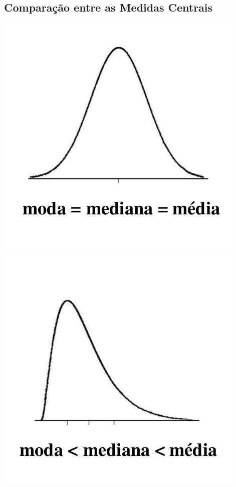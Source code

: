 \documentclass{beamer}
\begin{document}
\subsection[Comparação]{Comparação entre as Medidas Centrais}

\begin{frame}
    \includegraphics[height=0.4\textheight]{medidas1}
    \includegraphics[height=0.4\textheight]{medidas2}

\end{frame}
\end{document}
